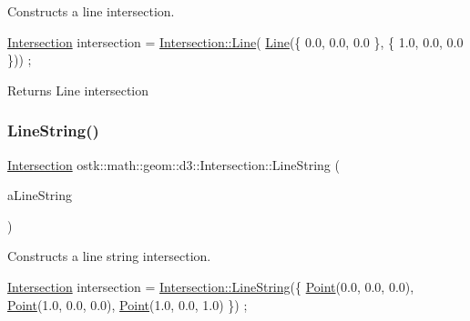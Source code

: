 Constructs a line intersection. 


\begin{DoxyCode}
\hyperlink{classostk_1_1math_1_1geom_1_1d3_1_1_intersection_a6091ab689809d0da1e670ca18dffb2d8}{Intersection} intersection = \hyperlink{classostk_1_1math_1_1geom_1_1d3_1_1_intersection_a651b8385b994ba358e1422c867e94473}{Intersection::Line}(
      \hyperlink{classostk_1_1math_1_1geom_1_1d3_1_1_intersection_a651b8385b994ba358e1422c867e94473}{Line}(\{ 0.0, 0.0, 0.0 \}, \{ 1.0, 0.0, 0.0 \})) ;
\end{DoxyCode}


\begin{DoxyReturn}{Returns}
Line intersection 
\end{DoxyReturn}
\mbox{\label{classostk_1_1math_1_1geom_1_1d3_1_1_intersection_a2c90187dbba7699e21a0c27ef682453f}} 
\subsubsection{\texorpdfstring{Line\+String()}{LineString()}}
{\footnotesize\ttfamily \hyperlink{classostk_1_1math_1_1geom_1_1d3_1_1_intersection}{Intersection} ostk\+::math\+::geom\+::d3\+::\+Intersection\+::\+Line\+String (\begin{DoxyParamCaption}\item[{const \hyperlink{classostk_1_1math_1_1geom_1_1d3_1_1objects_1_1_line_string}{objects\+::\+Line\+String} \&}]{a\+Line\+String }\end{DoxyParamCaption})\hspace{0.3cm}{\ttfamily [static]}}



Constructs a line string intersection. 


\begin{DoxyCode}
\hyperlink{classostk_1_1math_1_1geom_1_1d3_1_1_intersection_a6091ab689809d0da1e670ca18dffb2d8}{Intersection} intersection = \hyperlink{classostk_1_1math_1_1geom_1_1d3_1_1_intersection_a2c90187dbba7699e21a0c27ef682453f}{Intersection::LineString}(\{ 
      \hyperlink{classostk_1_1math_1_1geom_1_1d3_1_1_intersection_afd86dcb53b13578098048dc5c76a9601}{Point}(0.0, 0.0, 0.0), \hyperlink{classostk_1_1math_1_1geom_1_1d3_1_1_intersection_afd86dcb53b13578098048dc5c76a9601}{Point}(1.0, 0.0, 0.0), \hyperlink{classostk_1_1math_1_1geom_1_1d3_1_1_intersection_afd86dcb53b13578098048dc5c76a9601}{Point}(1.0, 0.0, 1.0) \}) ;
\end{DoxyCode}


